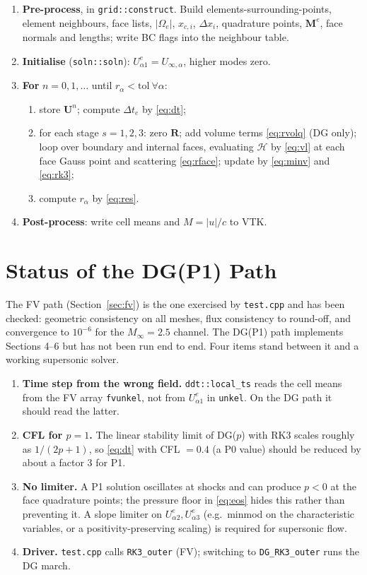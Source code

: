 \documentclass[11pt,a4paper]{article}
\theoremstyle{remark}
\theoremstyle{definition}
\newcommand{\U}{\mathbf{U}}
\newcommand{\R}{\mathbf{R}}
\newcommand{\M}{\mathbf{M}}
\newcommand{\Hf}{\mathcal{H}}
\begin{document}
\begin{enumerate}[label=\arabic*.]
\item \textbf{Pre-process}, in \texttt{grid::construct}. Build elements-surrounding-points, element neighbours, face lists, $|\Omega_e|$, $x_{c,i}$, $\Delta x_i$, quadrature points, $\M^e$, face normals and lengths; write BC flags into the neighbour table.
\item \textbf{Initialise} (\texttt{soln::soln}): $U^e_{\alpha1}=U_{\infty,\alpha}$, higher modes zero.
\item \textbf{For} $n=0,1,\dots$ until $r_\alpha<\mathrm{tol}\ \forall\alpha$:
  \begin{enumerate}[label=(\alph*)]
  \item store $\U^n$; compute $\Delta t_e$ by \eqref{eq:dt};
  \item for each stage $s=1,2,3$: zero $\R$; add volume terms \eqref{eq:rvolq} (DG only); loop over boundary and internal faces, evaluating $\Hf$ by \eqref{eq:vl} at each face Gauss point and scattering \eqref{eq:rface}; update by \eqref{eq:minv} and \eqref{eq:rk3};
  \item compute $r_\alpha$ by \eqref{eq:res}.
  \end{enumerate}
\item \textbf{Post-process}: write cell means and $M=|u|/c$ to VTK.
\end{enumerate}

\appendix
\section{Status of the DG(P1) Path}

The FV path (Section~\ref{sec:fv}) is the one exercised by \texttt{test.cpp} and has been checked: geometric consistency on all meshes, flux consistency to round-off, and convergence to $10^{-6}$ for the $M_\infty=2.5$ channel. The DG(P1) path implements Sections 4--6 but has not been run end to end. Four items stand between it and a working supersonic solver.

\begin{enumerate}[label=(\roman*)]
\item \textbf{Time step from the wrong field.} \texttt{ddt::local\_ts} reads the cell means from the FV array \texttt{fvunkel}, not from $U^e_{\alpha1}$ in \texttt{unkel}. On the DG path it should read the latter.
\item \textbf{CFL for $p=1$.} The linear stability limit of DG($p$) with RK3 scales roughly as $1/(2p+1)$, so \eqref{eq:dt} with CFL $=0.4$ (a P0 value) should be reduced by about a factor 3 for P1.
\item \textbf{No limiter.} A P1 solution oscillates at shocks and can produce $p<0$ at the face quadrature points; the pressure floor in \eqref{eq:eos} hides this rather than preventing it. A slope limiter on $U^e_{\alpha2},U^e_{\alpha3}$ (e.g.\ minmod on the characteristic variables, or a positivity-preserving scaling) is required for supersonic flow.
\item \textbf{Driver.} \texttt{test.cpp} calls \texttt{RK3\_outer} (FV); switching to \texttt{DG\_RK3\_outer} runs the DG march.
\end{enumerate}
\end{document}
